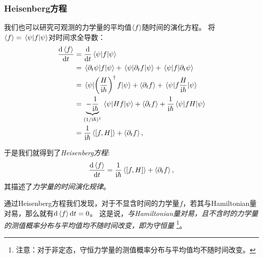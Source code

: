 \subsubsection{Heisenberg方程}

我们也可以研究可观测的力学量的平均值$\expval{f}$随时间的演化方程。
将$\expval{f}=\mel{\psi}{f}{\psi}$对时间求全导数：
\begin{equation}
\begin{aligned}
\frac{\dd \expval{f}}{\dd t}
&= \frac{\dd}{\dd t} \mel{\psi}{f}{\psi} \\
&= \mel{\partial_t \psi}{f}{\psi} + \mel{\psi}{\partial_t f}{\psi} + \mel{\psi}{f}{\partial_t \psi} \\
&= \mel{\psi}{\left(\frac{H}{\mathrm{i}\hbar}\right)^\dag f}{\psi} + \expval{\partial_t f} + \mel{\psi}{f \frac{H}{\mathrm{i}\hbar}}{\psi} \\
&= \underbrace{-\frac{1}{\mathrm{i}\hbar}}_{(1/\mathrm{i}\hbar)^\dag}\mel{\psi}{H f}{\psi} + \expval{\partial_t f} + \frac{1}{\mathrm{i}\hbar}\mel{\psi}{fH}{\psi} \\
&= \frac{1}{\mathrm{i}\hbar}\expval{[f,H]} + \expval{\partial_t f},
\end{aligned}
\end{equation}
\begin{tcolorbox}
于是我们就得到了\emph{Heisenberg方程}:
\begin{equation}
    \frac{\dd \expval{f}}{\dd t} = \frac{1}{\mathrm{i}\hbar}\expval{[f,H]} + \expval{\partial_t f},
\end{equation}
其描述了\emph{力学量的时间演化规律}。
\end{tcolorbox}

通过Heisenberg方程我们发现，对于不显含时间的力学量$f$，若其与Hamiltonian量对易，那么就有$\dd \expval{f}\dd t = 0$。
这是说，\emph{与Hamiltonian量对易，且不含时的力学量的测值概率分布与平均值均不随时间改变，即为守恒量}
\footnote{注意：对于非定态，守恒力学量的测值概率分布与平均值均不随时间改变。}。
